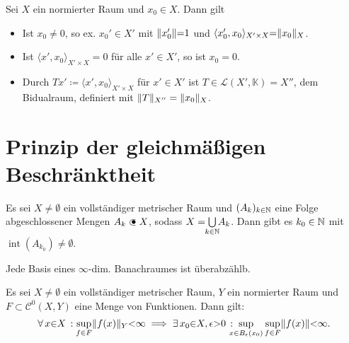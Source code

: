 \documentclass{cheat-sheet}
\newcommand{\K}{\mathbb{K}}
\newcommand{\inte}{\mathop{\mathrm{int}}} %
\begin{document}
\begin{samepage}

\begin{kor}
  Sei $X$ ein normierter Raum und $x_0 \in X$. Dann gilt
  \begin{itemize}
    \item  Ist $x_0 \not= 0$, so ex. $x_0' \in X'$ mit $\lVert x_0'\rVert {=} 1$ und $\langle x_0', x_0 \rangle_{X' {\times} X} {=} \lVert x_0\rVert_X$.
    \item Ist $\langle x', x_0 \rangle_{X' {\times} X} = 0$ für alle $x' \in X'$, so ist $x_0 = 0$.
    \item Durch $Tx' \coloneqq \langle x', x_0 \rangle_{X' {\times} X}$ für $x' \in X'$ ist $T \in \mathcal{L}(X', \K) = X''$, dem Bidualraum, definiert mit $\lVert T\rVert_{X''} = \lVert x_0\rVert_X$.
  \end{itemize}
\end{kor}

\section{Prinzip der gleichmäßigen Beschränktheit}

\end{samepage}

\begin{satz}
  Es sei $X \not= \emptyset$ ein vollständiger metrischer Raum und $(A_k)_{k \in \mathbb{N}}$ eine Folge abgeschlossener Mengen $A_k \cls X$, sodass $X = \bigcup_{\mathclap{k \in \N}} A_k$. Dann gibt es $k_0 \in \mathbb{N}$ mit $\inte(A_{k_0}) \not= \emptyset$.
\end{satz}

\begin{kor}
  Jede Basis eines $\infty$-dim. Banachraumes ist überabzählb.
\end{kor}

\begin{satz}
  Es sei $X \not= \emptyset$ ein vollständiger metrischer Raum, $Y$ ein normierter Raum und $F \subset \mathcal{C}^0(X, Y)$ eine Menge von Funktionen. Dann gilt:
  \[
    \forall \, {x {\in} X} \,:\, \! \sup_{f \in F} \lVert f(x)\rVert_Y {<} \infty
    \implies
    \exists \, {x_0 {\in} X, \epsilon {>} 0} \,:\, \!\!\!\!\! \sup_{x {\in} B_\epsilon(x_0)} \sup_{f \in F} \lVert f(x)\rVert {<} \infty.
  \]
\end{satz}
\end{document}
